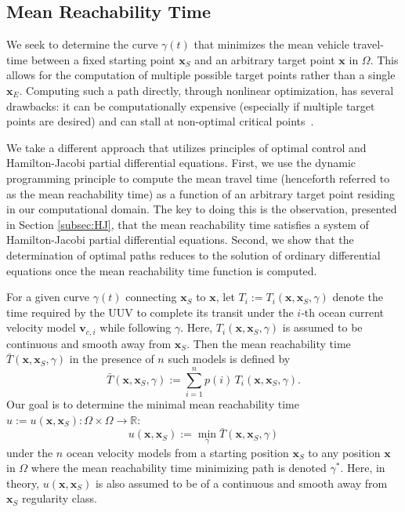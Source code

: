 \documentclass[pdflatex,sn-mathphys-num]{sn-jnl}%
\def \bx{{\mathbf {x}}}
\def \bv{{\mathbf {v}}}
\theoremstyle{thmstyleone}%
\theoremstyle{thmstyletwo}%
\theoremstyle{thmstylethree}%
\begin{document}
\subsection{Mean Reachability Time}
\label{sec:mrt}
We seek to determine the curve $\gamma(t)$ that minimizes the mean vehicle travel-time between a fixed starting point $\bx_S$ and an arbitrary target point $\bx$ in $\Omega$.  This allows for the computation of multiple possible target points rather than a single $\bx_E$.  Computing such a path directly, through nonlinear optimization, has several drawbacks: it can be computationally expensive (especially if multiple target points are desired) and can stall at non-optimal critical points~\cite{Sethian2003}.

We take a different approach that utilizes principles of optimal control and Hamilton-Jacobi partial differential equations.  First, we use the dynamic programming principle to compute the mean travel time (henceforth referred to as the mean reachability time) as a function of an arbitrary target point residing in our computational domain.  The key to doing this is the observation, presented in Section \ref{subsec:HJ}, that the mean reachability time satisfies a system of Hamilton-Jacobi partial differential equations.  Second, we show that the determination of optimal paths reduces to the solution of ordinary differential equations once the mean reachability time function is computed. 


For a given curve $\gamma(t)$ connecting $\bx_S$ to $\bx$, let $T_i := T_i(\bx,\bx_S,\gamma)$ denote the time required by the UUV to complete its transit under the \(i\)‑th ocean current velocity model \(\bv_{c,i}\) while following $\gamma$.  {Here, $T_i(\bx,\bx_S,\gamma)$ is assumed to be continuous and smooth away from $\bx_S$.}  Then the mean reachability time \(\bar{T}(\bx,\bx_S,\gamma)\)  in the presence of \(n\) such models is defined by
\begin{equation}\label{eq:weighted-time}
\bar{T}(\bx,\bx_S,\gamma)
:=\sum_{i=1}^n p(i)\,T_i(\bx, \bx_S,\gamma).
\end{equation}
Our goal is to determine the minimal mean reachability time $u:=u(\bx,\bx_S):\Omega \times \Omega \rightarrow \mathbb{R}$:
\begin{equation}\label{eq:u-def}
u(\bx,\bx_S) := \min_{\gamma} \bar{T}(\bx, \bx_S, \gamma)
\end{equation}
under the $n$ ocean velocity models from a starting position $\bx_S$ to any position $\bx$ in $\Omega$ where the { mean reachability time} minimizing path is denoted $\gamma^*$.  {Here, in theory, $u(\bx,\bx_S)$ is also assumed to be of a continuous and smooth away from $\bx_S$ regularity class.}
\end{document}
